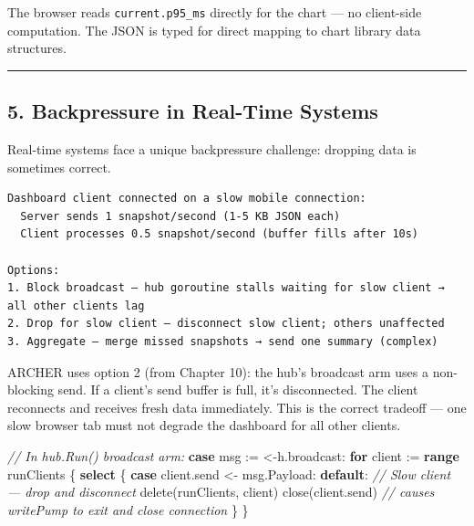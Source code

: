 \documentclass[
]{article}
\newenvironment{Shaded}{}{}
\newcommand{\BuiltInTok}[1]{\textcolor[rgb]{0.00,0.50,0.00}{#1}}
\newcommand{\CommentTok}[1]{\textcolor[rgb]{0.38,0.63,0.69}{\textit{#1}}}
\newcommand{\ControlFlowTok}[1]{\textcolor[rgb]{0.00,0.44,0.13}{\textbf{#1}}}
\newcommand{\KeywordTok}[1]{\textcolor[rgb]{0.00,0.44,0.13}{\textbf{#1}}}
\newcommand{\NormalTok}[1]{#1}
\newcommand{\OperatorTok}[1]{\textcolor[rgb]{0.40,0.40,0.40}{#1}}
\begin{document}
The browser reads \texttt{current.p95\_ms} directly for the chart --- no
client-side computation. The JSON is typed for direct mapping to chart
library data structures.

\begin{center}\rule{0.5\linewidth}{0.5pt}\end{center}

\hypertarget{backpressure-in-real-time-systems}{%
\subsection{5. Backpressure in Real-Time
Systems}\label{backpressure-in-real-time-systems}}

Real-time systems face a unique backpressure challenge: dropping data is
sometimes correct.

\begin{verbatim}
Dashboard client connected on a slow mobile connection:
  Server sends 1 snapshot/second (1-5 KB JSON each)
  Client processes 0.5 snapshot/second (buffer fills after 10s)

Options:
1. Block broadcast — hub goroutine stalls waiting for slow client → all other clients lag
2. Drop for slow client — disconnect slow client; others unaffected
3. Aggregate — merge missed snapshots → send one summary (complex)
\end{verbatim}

ARCHER uses option 2 (from Chapter 10): the hub's broadcast arm uses a
non-blocking send. If a client's send buffer is full, it's disconnected.
The client reconnects and receives fresh data immediately. This is the
correct tradeoff --- one slow browser tab must not degrade the dashboard
for all other clients.

\begin{Shaded}
\begin{Highlighting}[]
\CommentTok{// In hub.Run() broadcast arm:}
\ControlFlowTok{case}\NormalTok{ msg }\OperatorTok{:=} \OperatorTok{\textless{}{-}}\NormalTok{h}\OperatorTok{.}\NormalTok{broadcast}\OperatorTok{:}
    \ControlFlowTok{for}\NormalTok{ client }\OperatorTok{:=} \KeywordTok{range}\NormalTok{ runClients }\OperatorTok{\{}
        \ControlFlowTok{select} \OperatorTok{\{}
        \ControlFlowTok{case}\NormalTok{ client}\OperatorTok{.}\NormalTok{send }\OperatorTok{\textless{}{-}}\NormalTok{ msg}\OperatorTok{.}\NormalTok{Payload}\OperatorTok{:}
        \ControlFlowTok{default}\OperatorTok{:}
            \CommentTok{// Slow client — drop and disconnect}
            \BuiltInTok{delete}\OperatorTok{(}\NormalTok{runClients}\OperatorTok{,}\NormalTok{ client}\OperatorTok{)}
            \BuiltInTok{close}\OperatorTok{(}\NormalTok{client}\OperatorTok{.}\NormalTok{send}\OperatorTok{)} \CommentTok{// causes writePump to exit and close connection}
        \OperatorTok{\}}
    \OperatorTok{\}}
\end{Highlighting}
\end{Shaded}
\end{document}
